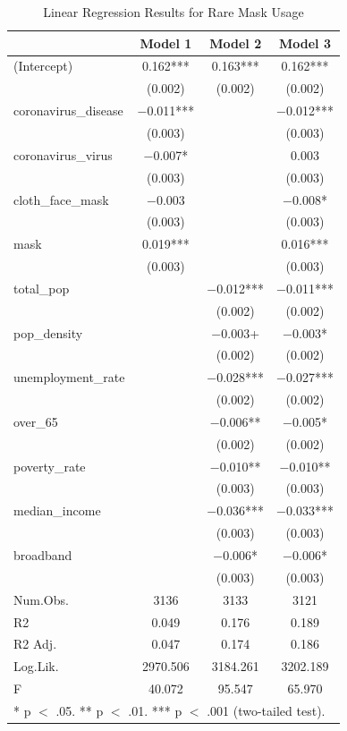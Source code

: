 \documentclass[
]{article}
\begin{document}
\begin{table}

\caption{\label{tab:mask_analysis}Linear Regression Results for Rare Mask Usage}
\centering
\begin{tabular}[t]{lccc}
\toprule
  & Model 1 & Model 2 & Model 3\\
\midrule
(Intercept) & \num{0.162}*** & \num{0.163}*** & \num{0.162}***\\
 & (\num{0.002}) & (\num{0.002}) & (\num{0.002})\\
coronavirus\_disease & \num{-0.011}*** &  & \num{-0.012}***\\
 & (\num{0.003}) &  & \vphantom{3} (\num{0.003})\\
coronavirus\_virus & \num{-0.007}* &  & \num{0.003}\\
 & (\num{0.003}) &  & \vphantom{2} (\num{0.003})\\
cloth\_face\_mask & \num{-0.003} &  & \num{-0.008}*\\
 & (\num{0.003}) &  & \vphantom{1} (\num{0.003})\\
mask & \num{0.019}*** &  & \num{0.016}***\\
 & (\num{0.003}) &  & (\num{0.003})\\
total\_pop &  & \num{-0.012}*** & \num{-0.011}***\\
 &  & (\num{0.002}) & \vphantom{3} (\num{0.002})\\
pop\_density &  & \num{-0.003}+ & \num{-0.003}*\\
 &  & (\num{0.002}) & \vphantom{2} (\num{0.002})\\
unemployment\_rate &  & \num{-0.028}*** & \num{-0.027}***\\
 &  & (\num{0.002}) & \vphantom{1} (\num{0.002})\\
over\_65 &  & \num{-0.006}** & \num{-0.005}*\\
 &  & (\num{0.002}) & (\num{0.002})\\
poverty\_rate &  & \num{-0.010}** & \num{-0.010}**\\
 &  & (\num{0.003}) & \vphantom{2} (\num{0.003})\\
median\_income &  & \num{-0.036}*** & \num{-0.033}***\\
 &  & (\num{0.003}) & \vphantom{1} (\num{0.003})\\
broadband &  & \num{-0.006}* & \num{-0.006}*\\
 &  & (\num{0.003}) & (\num{0.003})\\
\midrule
Num.Obs. & \num{3136} & \num{3133} & \num{3121}\\
R2 & \num{0.049} & \num{0.176} & \num{0.189}\\
R2 Adj. & \num{0.047} & \num{0.174} & \num{0.186}\\
Log.Lik. & \num{2970.506} & \num{3184.261} & \num{3202.189}\\
F & \num{40.072} & \num{95.547} & \num{65.970}\\
\bottomrule
\multicolumn{4}{l}{\rule{0pt}{1em}* p $<$ .05. ** p $<$ .01. *** p $<$ .001 (two-tailed test).}\\
\end{tabular}
\end{table}
\end{document}
